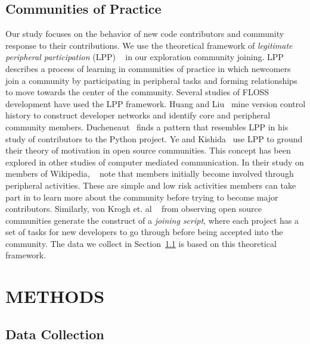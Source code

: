 \documentclass{sigchi}
\begin{document}
\subsection{Communities of Practice} \label{sec:communities}
Our study focuses on the behavior of new code contributors and community
response to their contributions. We use the theoretical framework of
\textit{legitimate peripheral participation} (LPP) ~\cite{lave_situated_1991} in
our exploration community joining. LPP describes a process of learning in
communities of practice in which newcomers join a community by participating in
peripheral tasks and forming relationships to move towards the center of the
community. Several studies of FLOSS development have used the LPP framework.
Huang and Liu~\cite{huang_mining_2005} mine version control history to construct
developer networks and identify core and peripheral community members.
Ducheneaut~\cite{ducheneaut_socialization_2005} finds a pattern that resembles
LPP in his study of contributors to the Python project. Ye and
Kishida~\cite{ye_toward_2003} use LPP to ground their theory of motivation in
open source communities. This concept has been explored in other studies of
computer mediated communication.  In their study on members of Wikipedia,
~\cite{bryant_becoming_2005} note that members initially become involved through
peripheral activities. These are simple and low risk activities members can take
part in to learn more about the community before trying to become major
contributors. Similarly, von Krogh et. al ~\cite{von_krogh_community_2003} from
observing open source communities generate the construct of a \textit{joining
script}, where each project has a set of tasks for new developers to go through
before being accepted into the community. The data we collect in
Section~\ref{sec:datacollection} is based on this theoretical framework.

\section{METHODS} \label{chap:methods}


\subsection{Data Collection} \label{sec:datacollection}
\end{document}
